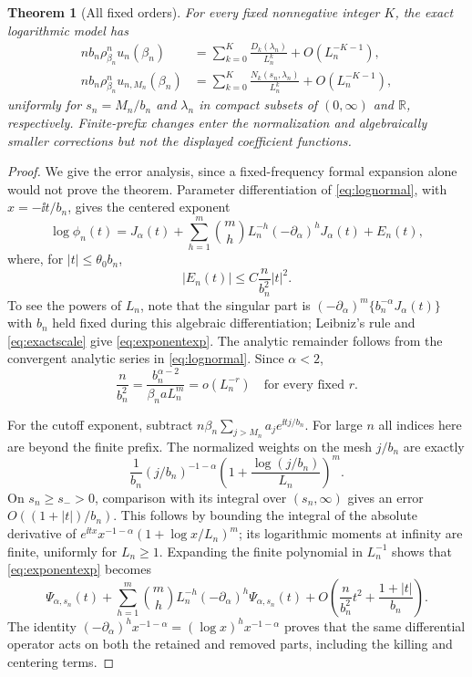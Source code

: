 \documentclass[11pt,a4paper]{article}
\numberwithin{equation}{section}
\newtheorem{theorem}{Theorem}[section]
\theoremstyle{definition}\newtheorem{definition}[theorem]{Definition}
\theoremstyle{remark}\newtheorem{remark}[theorem]{Remark}
\theoremstyle{definition}
\newcommand{\R}{\mathbb R}\newcommand{\C}{\mathbb C}
\begin{document}
\begin{theorem}[All fixed orders]\label{thm:allorders}
For every fixed nonnegative integer $K$, the exact logarithmic model has
\begin{align}
 n b_n\rho_{\beta_n}^{n}u_n(\beta_n)
 &=\sum_{k=0}^K\frac{D_k(\lambda_n)}{L_n^k}+O(L_n^{-K-1}),
 \label{eq:allfull}\\
 n b_n\rho_{\beta_n}^{n}u_{n,M_n}(\beta_n)
 &=\sum_{k=0}^K\frac{N_k(s_n,\lambda_n)}{L_n^k}+O(L_n^{-K-1}),
 \label{eq:allcut}
\end{align}
uniformly for $s_n=M_n/b_n$ and $\lambda_n$ in compact subsets of
$(0,\infty)$ and $\R$, respectively. Finite-prefix changes enter the
normalization and algebraically smaller corrections but not the displayed
coefficient functions.
\end{theorem}
\begin{proof}
We give the error analysis, since a fixed-frequency formal expansion alone
would not prove the theorem. Parameter differentiation of
\eqref{eq:lognormal}, with $x=-\ii t/b_n$, gives the centered exponent
\begin{equation}\label{eq:exponentexp}
 \log\phi_n(t)=J_\alpha(t)
 +\sum_{h=1}^m\binom mh L_n^{-h}(-\partial_\alpha)^hJ_\alpha(t)
 +E_n(t),
\end{equation}
where, for $|t|\le\theta_0b_n$,
\begin{equation}\label{eq:analyticerror}
 |E_n(t)|\le C\frac n{b_n^2}|t|^2.
\end{equation}
To see the powers of $L_n$, note that the singular part is
$(-\partial_\alpha)^m\{b_n^{-\alpha}J_\alpha(t)\}$ with $b_n$ held
fixed during this algebraic differentiation; Leibniz's rule and
\eqref{eq:exactscale} give \eqref{eq:exponentexp}.
The analytic remainder follows from the convergent analytic series in
\eqref{eq:lognormal}. Since $\alpha<2$,
\[
 \frac n{b_n^2}=\frac{b_n^{\alpha-2}}{\beta_n a L_n^m}
              =o(L_n^{-r})\quad\text{for every fixed }r.
\]

For the cutoff exponent, subtract
$n\beta_n\sum_{j>M_n}a_je^{\ii tj/b_n}$. For large $n$ all indices here
are beyond the finite prefix. The normalized weights on the mesh $j/b_n$
are exactly
\[
 \frac1{b_n}(j/b_n)^{-1-\alpha}
       \left(1+\frac{\log(j/b_n)}{L_n}\right)^m.
\]
On $s_n\ge s_->0$, comparison with its integral over $(s_n,\infty)$
gives an error $O((1+|t|)/b_n)$. This follows by bounding the integral of
the absolute derivative of
$e^{\ii tx}x^{-1-\alpha}(1+\log x/L_n)^m$; its logarithmic moments at
infinity are finite, uniformly for $L_n\ge1$. Expanding the finite
polynomial in $L_n^{-1}$ shows that \eqref{eq:exponentexp} becomes
\begin{equation}\label{eq:cutexponentexp}
 \Psi_{\alpha,s_n}(t)+
 \sum_{h=1}^m\binom mhL_n^{-h}(-\partial_\alpha)^h\Psi_{\alpha,s_n}(t)
 +O\left(\frac n{b_n^2}t^2+\frac{1+|t|}{b_n}\right).
\end{equation}
The identity $(-\partial_\alpha)^h x^{-1-\alpha}
=(\log x)^h x^{-1-\alpha}$ proves that the same differential operator
acts on both the retained and removed parts, including the killing and
centering terms.


\end{proof}
\end{document}
